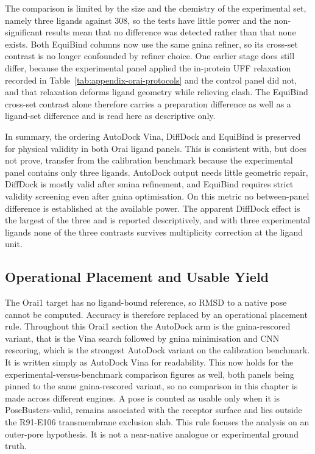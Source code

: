 The comparison is limited by the size and the chemistry of the experimental set, namely three ligands against 308, so the tests have little power and the non-significant results mean that no difference was detected rather than that none exists. Both EquiBind columns now use the same gnina refiner, so its cross-set contrast is no longer confounded by refiner choice. One earlier stage does still differ, because the experimental panel applied the in-protein UFF relaxation recorded in Table~\ref{tab:appendix-orai-protocols} and the control panel did not, and that relaxation deforms ligand geometry while relieving clash. The EquiBind cross-set contrast alone therefore carries a preparation difference as well as a ligand-set difference and is read here as descriptive only.

In summary, the ordering AutoDock Vina, DiffDock and EquiBind is preserved for physical validity in both Orai ligand panels. This is consistent with, but does not prove, transfer from the calibration benchmark because the experimental panel contains only three ligands. AutoDock output needs little geometric repair, DiffDock is mostly valid after smina refinement, and EquiBind requires strict validity screening even after gnina optimisation. On this metric no between-panel difference is established at the available power. The apparent DiffDock effect is the largest of the three and is reported descriptively, and with three experimental ligands none of the three contrasts survives multiplicity correction at the ligand unit.

\hypertarget{operational-placement-and-usable-yield}{%
\subsection{\texorpdfstring{Operational Placement and Usable Yield }{Operational Placement and Usable Yield }}\label{operational-placement-and-usable-yield}}

The Orai1 target has no ligand-bound reference, so RMSD to a native pose cannot be computed. Accuracy is therefore replaced by an operational placement rule. Throughout this Orai1 section the AutoDock arm is the gnina-rescored variant, that is the Vina search followed by gnina minimisation and CNN rescoring, which is the strongest AutoDock variant on the calibration benchmark. It is written simply as AutoDock Vina for readability. This now holds for the experimental-versus-benchmark comparison figures as well, both panels being pinned to the same gnina-rescored variant, so no comparison in this chapter is made across different engines. A pose is counted as usable only when it is PoseBusters-valid, remains associated with the receptor surface and lies outside the R91-E106 transmembrane exclusion slab. This rule focuses the analysis on an outer-pore hypothesis. It is not a near-native analogue or experimental ground truth.


